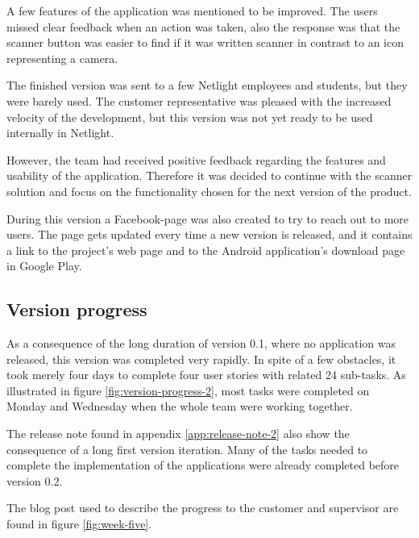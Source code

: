 A few features of the application was mentioned to be improved. The users missed clear feedback when an action was taken, also the response was that the scanner button was easier to find if it was written scanner in contrast to an icon representing a camera. 

The finished version was sent to a few Netlight employees and students, but they were barely used. The customer representative was pleased with the increased velocity of the development, but this version was not yet ready to be used internally in Netlight. 

However, the team had received positive feedback regarding the features and usability of the application. Therefore it was decided to continue with the scanner solution and focus on the functionality chosen for the next version of the product. 

During this version a Facebook-page was also created to try to reach out to more users. The page gets updated every time a new version is released, and it contains a link to the project’s web page and to the Android application’s download page in Google Play. 

\subsection{Version progress}
As a consequence of the long duration of version 0.1, where no application was released, this version was completed very rapidly. In spite of a few obstacles, it took merely four days to complete four user stories with related 24 sub-tasks. As illustrated in figure \ref{fig:version-progress-2}, most tasks were completed on Monday and Wednesday when the whole team were working together. 

The release note found in appendix \ref{app:release-note-2} also show the consequence of a long first version iteration. Many of the tasks needed to complete the implementation of the applications were already completed before version 0.2.

The blog post used to describe the progress to the customer and supervisor are found in figure \ref{fig:week-five}.

